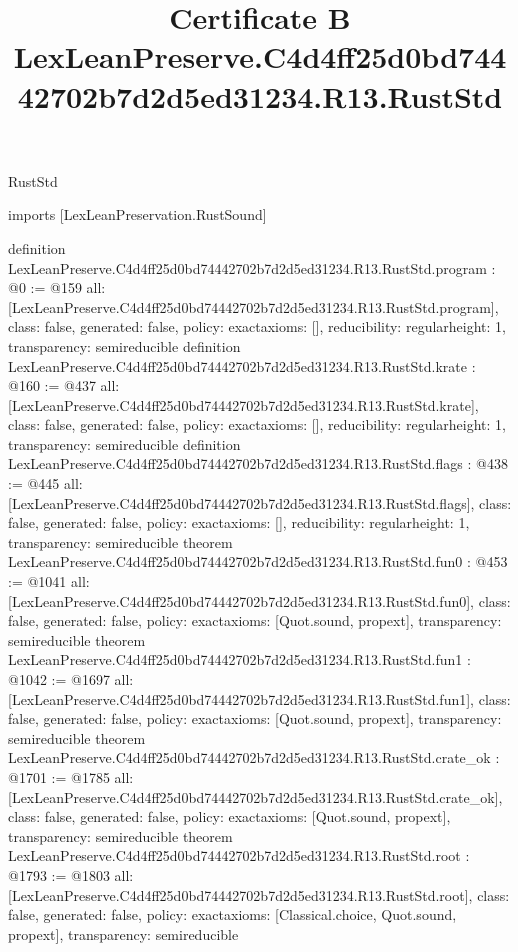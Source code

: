 \begin{lexlean}{RustStd}
\title{Certificate B LexLeanPreserve.C4d4ff25d0bd74442702b7d2d5ed31234.R13.RustStd}
\begin{coremodule}
imports [LexLeanPreservation.RustSound]

definition LexLeanPreserve.C4d4ff25d0bd74442702b7d2d5ed31234.R13.RustStd.program : @0 := @159 {
  all: [LexLeanPreserve.C4d4ff25d0bd74442702b7d2d5ed31234.R13.RustStd.program],
  class: false,
  generated: false,
  policy: exact{axioms: []},
  reducibility: regular{height: 1},
  transparency: semireducible
}
definition LexLeanPreserve.C4d4ff25d0bd74442702b7d2d5ed31234.R13.RustStd.krate : @160 := @437 {
  all: [LexLeanPreserve.C4d4ff25d0bd74442702b7d2d5ed31234.R13.RustStd.krate],
  class: false,
  generated: false,
  policy: exact{axioms: []},
  reducibility: regular{height: 1},
  transparency: semireducible
}
definition LexLeanPreserve.C4d4ff25d0bd74442702b7d2d5ed31234.R13.RustStd.flags : @438 := @445 {
  all: [LexLeanPreserve.C4d4ff25d0bd74442702b7d2d5ed31234.R13.RustStd.flags],
  class: false,
  generated: false,
  policy: exact{axioms: []},
  reducibility: regular{height: 1},
  transparency: semireducible
}
theorem LexLeanPreserve.C4d4ff25d0bd74442702b7d2d5ed31234.R13.RustStd.fun0 : @453 := @1041 {
  all: [LexLeanPreserve.C4d4ff25d0bd74442702b7d2d5ed31234.R13.RustStd.fun0],
  class: false,
  generated: false,
  policy: exact{axioms: [Quot.sound, propext]},
  transparency: semireducible
}
theorem LexLeanPreserve.C4d4ff25d0bd74442702b7d2d5ed31234.R13.RustStd.fun1 : @1042 := @1697 {
  all: [LexLeanPreserve.C4d4ff25d0bd74442702b7d2d5ed31234.R13.RustStd.fun1],
  class: false,
  generated: false,
  policy: exact{axioms: [Quot.sound, propext]},
  transparency: semireducible
}
theorem LexLeanPreserve.C4d4ff25d0bd74442702b7d2d5ed31234.R13.RustStd.crate_ok : @1701 := @1785 {
  all: [LexLeanPreserve.C4d4ff25d0bd74442702b7d2d5ed31234.R13.RustStd.crate_ok],
  class: false,
  generated: false,
  policy: exact{axioms: [Quot.sound, propext]},
  transparency: semireducible
}
theorem LexLeanPreserve.C4d4ff25d0bd74442702b7d2d5ed31234.R13.RustStd.root : @1793 := @1803 {
  all: [LexLeanPreserve.C4d4ff25d0bd74442702b7d2d5ed31234.R13.RustStd.root],
  class: false,
  generated: false,
  policy: exact{axioms: [Classical.choice, Quot.sound, propext]},
  transparency: semireducible
}


\end{coremodule}
\end{lexlean}
